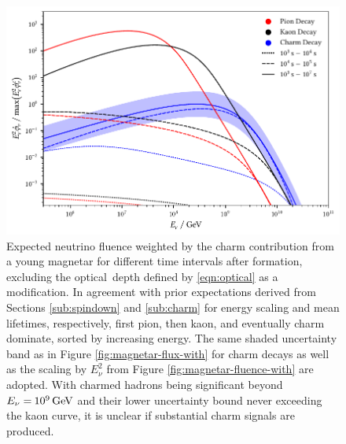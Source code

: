\begin{figure}[H]
	\centering
	\includegraphics{../plots/build/magnetar_integrated_neutrino_spectrum_without.pdf}
	\caption[Magnetar $\nu \kern+0.5pt$ fluence compared to $c$ decay without optical depth.]
			{Expected neutrino fluence weighted by the charm contribution from a young magnetar for different time
			 intervals after formation, excluding the optical~depth defined by \eqref{eqn:optical} as a modification.
			 In agreement with prior expectations derived from Sections \ref{sub:spindown} and \ref{sub:charm} for energy
			 scaling and mean lifetimes, respectively, first pion, then kaon, and eventually charm dominate, sorted
			 by increasing energy. The same shaded uncertainty band as in Figure \ref{fig:magnetar-flux-with}
			 for charm decays as well as the scaling by $E_\nu^2$ from Figure \ref{fig:magnetar-fluence-with} are adopted.
			 With charmed hadrons being significant beyond $E_\nu = \kern-0.5pt \qty{e9}{\giga\electronvolt}$ and their lower
			 uncertainty bound never exceeding the kaon curve, it is unclear if substantial charm signals are produced.}
	\label{fig:magnetar-fluence-without}
\end{figure}
